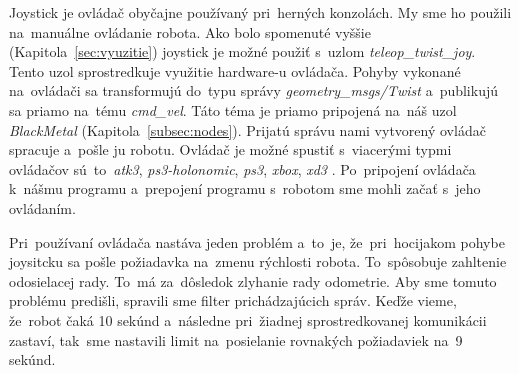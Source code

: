 Joystick je ovládač obyčajne používaný pri~herných konzolách. My sme ho použili na~manuálne ovládanie robota. Ako bolo
spomenuté vyššie (Kapitola~\ref{sec:vyuzitie}) joystick je možné použiť s~uzlom \textit{teleop\_twist\_joy}. Tento uzol
sprostredkuje využitie hardware-u ovládača. Pohyby vykonané na~ovládači sa transformujú do~typu správy
\textit{geometry\_msgs/Twist} a~publikujú sa priamo na~tému \textit{cmd\_vel}. Táto téma je priamo pripojená
na~náš uzol \textit{BlackMetal} (Kapitola~\ref{subsec:nodes}). Prijatú správu nami vytvorený ovládač spracuje a~pošle
ju robotu. Ovládač je možné spustiť s~viacerými typmi ovládačov sú~to~\textit{atk3}, \textit{ps3-holonomic},
\textit{ps3}, \textit{xbox}, \textit{xd3} \cite{teleopjoy}. Po~pripojení ovládača k~nášmu programu a~prepojení
programu s~robotom sme mohli začať s~jeho ovládaním.

Pri~používaní ovládača nastáva jeden problém a~to~je, že~pri~hocijakom pohybe joysitcku sa pošle požiadavka na~zmenu
rýchlosti robota. To~spôsobuje zahltenie odosielacej rady. To~má za~dôsledok zlyhanie rady odometrie. Aby sme tomuto
problému predišli, spravili sme filter prichádzajúcich správ. Keďže vieme, že~robot čaká 10 sekúnd a~následne
pri~žiadnej sprostredkovanej komunikácii zastaví, tak~sme nastavili limit na~posielanie rovnakých požiadaviek na~9 sekúnd.
